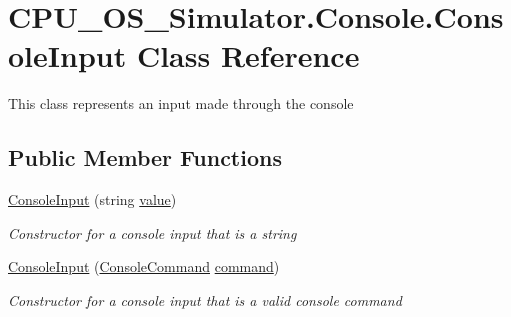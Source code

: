 \hypertarget{class_c_p_u___o_s___simulator_1_1_console_1_1_console_input}{}\section{C\+P\+U\+\_\+\+O\+S\+\_\+\+Simulator.\+Console.\+Console\+Input Class Reference}
\label{class_c_p_u___o_s___simulator_1_1_console_1_1_console_input}


This class represents an input made through the console  


\subsection*{Public Member Functions}
\begin{DoxyCompactItemize}
\item 
\hyperlink{class_c_p_u___o_s___simulator_1_1_console_1_1_console_input_aa3a9e93b929544e9432b4c1604977a25}{Console\+Input} (string \hyperlink{class_c_p_u___o_s___simulator_1_1_console_1_1_console_input_a859295836e526e9b8b5e3da265caa177}{value})
\begin{DoxyCompactList}\small\item\em Constructor for a console input that is a string \end{DoxyCompactList}\item 
\hyperlink{class_c_p_u___o_s___simulator_1_1_console_1_1_console_input_a52dbab6c35b6c3067ae65f5a3d8d6ebb}{Console\+Input} (\hyperlink{class_c_p_u___o_s___simulator_1_1_console_1_1_console_command}{Console\+Command} \hyperlink{class_c_p_u___o_s___simulator_1_1_console_1_1_console_input_afb0447ccf1317612da0230afe6445d3e}{command})
\begin{DoxyCompactList}\small\item\em Constructor for a console input that is a valid console command \end{DoxyCompactList}\end{DoxyCompactItemize}
